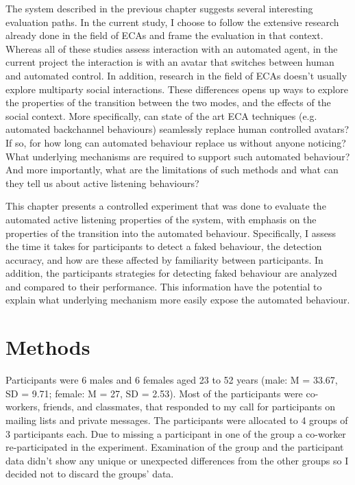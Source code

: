 \documentclass[]{simple-thesis}
\begin{document}
The system described in the previous chapter suggests several interesting evaluation paths.
In the current study, I choose to follow the extensive research already done in the field of ECAs \citep{Nishimura2007, Bevacqua2008, Gratch2007, Huang2011, Lee2006, Poppe2013} and frame the evaluation in that context.
Whereas all of these studies assess interaction with an automated agent, in the current project the interaction is with an avatar that switches between human and automated control.
In addition, research in the field of ECAs doesn't usually explore multiparty social interactions.
These differences opens up ways to explore the properties of the transition between the two modes, and the effects of the social context.
More specifically, can state of the art ECA techniques (e.g. automated backchannel behaviours) seamlessly replace human controlled avatars?
If so, for how long can automated behaviour replace us without anyone noticing?
What underlying mechanisms are required to support such automated behaviour?
And more importantly, what are the limitations of such methods and what can they tell us about active listening behaviours?

This chapter presents a controlled experiment that was done to evaluate the automated active listening properties of the system, with emphasis on the properties of the transition into the automated behaviour.
Specifically, I assess the time it takes for participants to detect a faked behaviour, the detection accuracy, and how are these affected by familiarity between participants.
In addition, the participants strategies for detecting faked behaviour are analyzed and compared to their performance.
This information have the potential to explain what underlying mechanism more easily expose the automated behaviour.

\section{Methods}

Participants were 6 males and 6 females aged 23 to 52 years (male: M = 33.67, SD = 9.71; female: M = 27, SD = 2.53).
Most of the participants were co-workers, friends, and classmates, that responded to my call for participants on mailing lists and private messages.
The participants were allocated to 4 groups of 3 participants each.
Due to missing a participant in one of the group a co-worker re-participated in the experiment.
Examination of the group and the participant data didn't show any unique or unexpected differences from the other groups so I decided not to discard the groups' data.
\end{document}
